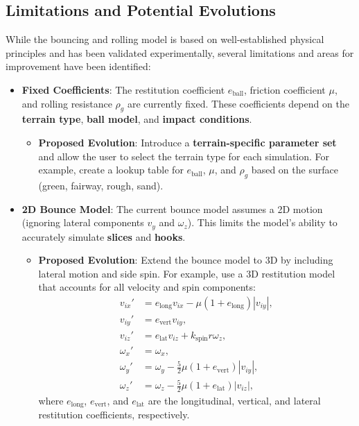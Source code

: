 \documentclass[10pt,a4paper]{report}
\begin{document}
\subsection{Limitations and Potential Evolutions}
\label{subsec:limitations_bouncing_rolling}

While the bouncing and rolling model is based on well-established physical principles and 
has been validated experimentally, several limitations and areas for improvement have been identified:

\begin{itemize}
    \item \textbf{Fixed Coefficients}:
    The restitution coefficient $e_{\text{ball}}$, friction coefficient $\mu$, and rolling 
    resistance $\rho_g$ are currently fixed. These coefficients depend on the \textbf{terrain type}, 
    \textbf{ball model}, and \textbf{impact conditions}.
    \begin{itemize}
        \item \textbf{Proposed Evolution}: Introduce a \textbf{terrain-specific parameter set} 
        and allow the user to select the terrain type for each simulation. For example, 
        create a lookup table for $e_{\text{ball}}$, $\mu$, and $\rho_g$ based on 
        the surface (green, fairway, rough, sand).
    \end{itemize}

    \item \textbf{2D Bounce Model}:
    The current bounce model assumes a 2D motion (ignoring lateral components 
    $v_y$ and $\omega_z$). This limits the model's ability to accurately simulate \textbf{slices} and \textbf{hooks}.
    \begin{itemize}
        \item \textbf{Proposed Evolution}: Extend the bounce model to 3D by including lateral 
        motion and side spin. For example, use a 3D restitution model that accounts for all velocity and spin components:
        \[
        \begin{aligned}
        v_{ix}' &= e_{\text{long}} v_{ix} - \mu (1 + e_{\text{long}}) |v_{iy}|, \\
        v_{iy}' &= e_{\text{vert}} v_{iy}, \\
        v_{iz}' &= e_{\text{lat}} v_{iz} + k_{\text{spin}} r \omega_z, \\
        \omega_x' &= \omega_x, \\
        \omega_y' &= \omega_y - \frac{5}{2} \mu (1 + e_{\text{vert}}) |v_{iy}|, \\
        \omega_z' &= \omega_z - \frac{5}{2} \mu (1 + e_{\text{lat}}) |v_{iz}|,
        \end{aligned}
        \]
        where $e_{\text{long}}$, $e_{\text{vert}}$, and $e_{\text{lat}}$ are the longitudinal, 
        vertical, and lateral restitution coefficients, respectively.
    \end{itemize}


\end{itemize}
\end{document}

